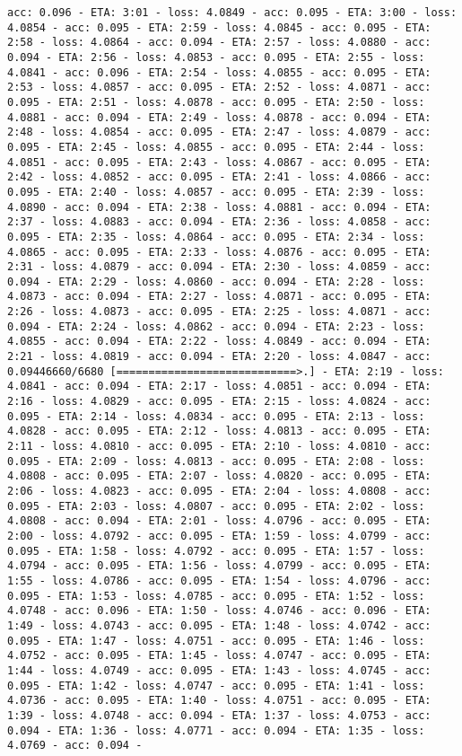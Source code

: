 \documentclass[11pt]{article}
\begin{document}
\begin{Verbatim}[commandchars=\\\{\}]
acc: 0.096 - ETA: 3:01 - loss: 4.0849 - acc: 0.095 - ETA: 3:00 - loss: 4.0854 - acc: 0.095 - ETA: 2:59 - loss: 4.0845 - acc: 0.095 - ETA: 2:58 - loss: 4.0864 - acc: 0.094 - ETA: 2:57 - loss: 4.0880 - acc: 0.094 - ETA: 2:56 - loss: 4.0853 - acc: 0.095 - ETA: 2:55 - loss: 4.0841 - acc: 0.096 - ETA: 2:54 - loss: 4.0855 - acc: 0.095 - ETA: 2:53 - loss: 4.0857 - acc: 0.095 - ETA: 2:52 - loss: 4.0871 - acc: 0.095 - ETA: 2:51 - loss: 4.0878 - acc: 0.095 - ETA: 2:50 - loss: 4.0881 - acc: 0.094 - ETA: 2:49 - loss: 4.0878 - acc: 0.094 - ETA: 2:48 - loss: 4.0854 - acc: 0.095 - ETA: 2:47 - loss: 4.0879 - acc: 0.095 - ETA: 2:45 - loss: 4.0855 - acc: 0.095 - ETA: 2:44 - loss: 4.0851 - acc: 0.095 - ETA: 2:43 - loss: 4.0867 - acc: 0.095 - ETA: 2:42 - loss: 4.0852 - acc: 0.095 - ETA: 2:41 - loss: 4.0866 - acc: 0.095 - ETA: 2:40 - loss: 4.0857 - acc: 0.095 - ETA: 2:39 - loss: 4.0890 - acc: 0.094 - ETA: 2:38 - loss: 4.0881 - acc: 0.094 - ETA: 2:37 - loss: 4.0883 - acc: 0.094 - ETA: 2:36 - loss: 4.0858 - acc: 0.095 - ETA: 2:35 - loss: 4.0864 - acc: 0.095 - ETA: 2:34 - loss: 4.0865 - acc: 0.095 - ETA: 2:33 - loss: 4.0876 - acc: 0.095 - ETA: 2:31 - loss: 4.0879 - acc: 0.094 - ETA: 2:30 - loss: 4.0859 - acc: 0.094 - ETA: 2:29 - loss: 4.0860 - acc: 0.094 - ETA: 2:28 - loss: 4.0873 - acc: 0.094 - ETA: 2:27 - loss: 4.0871 - acc: 0.095 - ETA: 2:26 - loss: 4.0873 - acc: 0.095 - ETA: 2:25 - loss: 4.0871 - acc: 0.094 - ETA: 2:24 - loss: 4.0862 - acc: 0.094 - ETA: 2:23 - loss: 4.0855 - acc: 0.094 - ETA: 2:22 - loss: 4.0849 - acc: 0.094 - ETA: 2:21 - loss: 4.0819 - acc: 0.094 - ETA: 2:20 - loss: 4.0847 - acc: 0.09446660/6680 [============================>.] - ETA: 2:19 - loss: 4.0841 - acc: 0.094 - ETA: 2:17 - loss: 4.0851 - acc: 0.094 - ETA: 2:16 - loss: 4.0829 - acc: 0.095 - ETA: 2:15 - loss: 4.0824 - acc: 0.095 - ETA: 2:14 - loss: 4.0834 - acc: 0.095 - ETA: 2:13 - loss: 4.0828 - acc: 0.095 - ETA: 2:12 - loss: 4.0813 - acc: 0.095 - ETA: 2:11 - loss: 4.0810 - acc: 0.095 - ETA: 2:10 - loss: 4.0810 - acc: 0.095 - ETA: 2:09 - loss: 4.0813 - acc: 0.095 - ETA: 2:08 - loss: 4.0808 - acc: 0.095 - ETA: 2:07 - loss: 4.0820 - acc: 0.095 - ETA: 2:06 - loss: 4.0823 - acc: 0.095 - ETA: 2:04 - loss: 4.0808 - acc: 0.095 - ETA: 2:03 - loss: 4.0807 - acc: 0.095 - ETA: 2:02 - loss: 4.0808 - acc: 0.094 - ETA: 2:01 - loss: 4.0796 - acc: 0.095 - ETA: 2:00 - loss: 4.0792 - acc: 0.095 - ETA: 1:59 - loss: 4.0799 - acc: 0.095 - ETA: 1:58 - loss: 4.0792 - acc: 0.095 - ETA: 1:57 - loss: 4.0794 - acc: 0.095 - ETA: 1:56 - loss: 4.0799 - acc: 0.095 - ETA: 1:55 - loss: 4.0786 - acc: 0.095 - ETA: 1:54 - loss: 4.0796 - acc: 0.095 - ETA: 1:53 - loss: 4.0785 - acc: 0.095 - ETA: 1:52 - loss: 4.0748 - acc: 0.096 - ETA: 1:50 - loss: 4.0746 - acc: 0.096 - ETA: 1:49 - loss: 4.0743 - acc: 0.095 - ETA: 1:48 - loss: 4.0742 - acc: 0.095 - ETA: 1:47 - loss: 4.0751 - acc: 0.095 - ETA: 1:46 - loss: 4.0752 - acc: 0.095 - ETA: 1:45 - loss: 4.0747 - acc: 0.095 - ETA: 1:44 - loss: 4.0749 - acc: 0.095 - ETA: 1:43 - loss: 4.0745 - acc: 0.095 - ETA: 1:42 - loss: 4.0747 - acc: 0.095 - ETA: 1:41 - loss: 4.0736 - acc: 0.095 - ETA: 1:40 - loss: 4.0751 - acc: 0.095 - ETA: 1:39 - loss: 4.0748 - acc: 0.094 - ETA: 1:37 - loss: 4.0753 - acc: 0.094 - ETA: 1:36 - loss: 4.0771 - acc: 0.094 - ETA: 1:35 - loss: 4.0769 - acc: 0.094 - 
\end{Verbatim}
\end{document}

